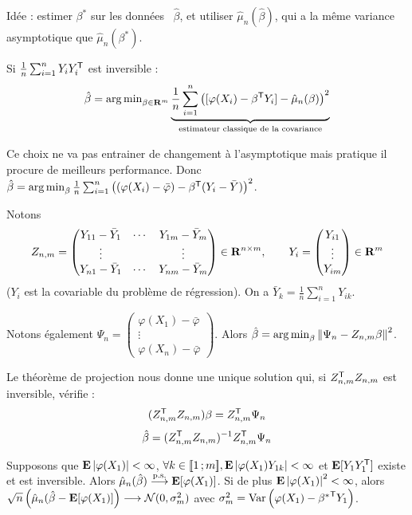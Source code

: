 	Idée : estimer $\beta^*$ sur les données \textrightarrow\ $\hat{\beta}$, et utiliser $\hat{\mu}_n(\hat{\beta})$, qui a la même variance asymptotique que $\hat{\mu}_n(\beta^*)$.
	
	Si $\frac{1}{n} \sum_{i = 1}^n Y_i Y_i^\mathsf{T}$ est inversible :
	$$\hat{\beta} = \operatorname{arg\, min}_{\beta \in \mathbf{R}^m}
	\underset{\text{estimateur classique de la covariance}}{\underbrace{\frac{1}{n} \sum_{i = 1}^n \left( [\varphi(X_i) - \beta^\mathsf{T} Y_i] - \hat{\mu}_n(\beta) \right)^2}}$$
	
	Ce choix ne va pas entrainer de changement à l'asymptotique mais pratique il procure de meilleurs performance.
	Donc $\hat{\beta} = \operatorname{arg\, min}_\beta \frac{1}{n} \sum_{i = 1}^n \left( (\varphi(X_i) - \bar{\varphi}) - \beta^\mathsf{T} (Y_i - \bar{Y}) \right)^2$.
	
	Notons
	$$Z_{n,m} = \begin{pmatrix}
		Y_{11} - \bar{Y}_1 & \cdots & Y_{1m} - \bar{Y}_m \\
		\vdots             &        & \vdots \\
		Y_{n1} - \bar{Y}_1 & \cdots & Y_{nm} - \bar{Y}_m
		\end{pmatrix} \in \mathbf{R}^{n \times m}, \qquad
		Y_i = \begin{pmatrix} Y_{i1} \\ \vdots \\ Y_{im} \end{pmatrix} \in \mathbf{R}^m$$
	($Y_i$ est la covariable du problème de régression).
	On a $\bar{Y}_k = \frac{1}{n} \sum_{i = 1}^n Y_{ik}$.
	
	Notons également $\Psi_n = \begin{pmatrix} \varphi(X_1) - \bar{\varphi} \\ \vdots \\ \varphi(X_n) - \bar{\varphi} \end{pmatrix}$.
	Alors $\hat{\beta} = \operatorname{arg\, min}_{\beta} \left\lVert\Psi_n - Z_{n,m}\beta\right\rVert^2$.
	
	Le théorème de projection nous donne une unique solution qui, si $Z_{n,m}^\mathsf{T} Z_{n,m}$ est inversible, vérifie :
	$$(Z_{n,m}^\mathsf{T} Z_{n,m}) \beta = Z_{n,m}^\mathsf{T} \Psi_n$$
	$$\hat{\beta} = (Z_{n,m}^\mathsf{T} Z_{n,m})^{-1} Z_{n,m}^\mathsf{T} \Psi_n$$
	
	\begin{pop}
		Supposons que $\mathbf{E} \left\lvert\varphi(X_1)\right\rvert < \infty$, $\forall k \in \mathopen{[\![}1\mathclose{}\mathpunct{};m\mathclose{]\!]}, \mathbf{E} \left\lvert\varphi(X_1) Y_{1k}\right\rvert < \infty$ et $\mathbf{E}[Y_1 Y_1^\mathsf{T}]$ existe et est inversible.
		Alors $\hat{\mu}_n(\hat{\beta}) \overset{\text{p.s.}}{\longrightarrow} \mathbf{E}[\varphi(X_1)]$.
		Si de plus $\mathbf{E} \left\lvert\varphi(X_1)\right\rvert^2 < \infty$, alors $\sqrt{n} \left( \hat{\mu}_n(\hat{\beta} - \mathbf{E}[\varphi(X_1)] \right) \longrightarrow \mathcal{N}(0,\sigma_m^2)$ avec $\sigma_m^2 = \operatorname{Var} \left( \varphi(X_1) - {\beta^*}^\mathsf{T} Y_1 \right)$.
	\end{pop}
	
